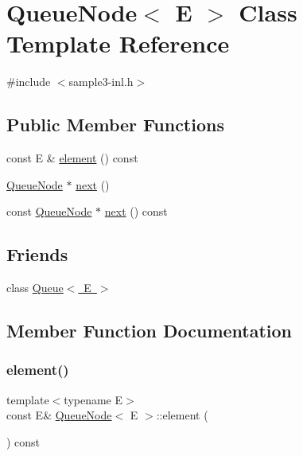 \hypertarget{classQueueNode}{}\section{Queue\+Node$<$ E $>$ Class Template Reference}
\label{classQueueNode}


{\ttfamily \#include $<$sample3-\/inl.\+h$>$}

\subsection*{Public Member Functions}
\begin{DoxyCompactItemize}
\item 
const E \& \mbox{\hyperlink{classQueueNode_a1c61b3ed32e089f5901b87022ef84985}{element}} () const
\item 
\mbox{\hyperlink{classQueueNode}{Queue\+Node}} $\ast$ \mbox{\hyperlink{classQueueNode_a8a9fdf488da06533360999ef85db56ea}{next}} ()
\item 
const \mbox{\hyperlink{classQueueNode}{Queue\+Node}} $\ast$ \mbox{\hyperlink{classQueueNode_ada477e4f309f29383112dbda473dd985}{next}} () const
\end{DoxyCompactItemize}
\subsection*{Friends}
\begin{DoxyCompactItemize}
\item 
class \mbox{\hyperlink{classQueueNode_ad4336229b1d7c3626e4ba69f236b202d}{Queue$<$ E $>$}}
\end{DoxyCompactItemize}


\subsection{Member Function Documentation}
\mbox{\label{classQueueNode_a1c61b3ed32e089f5901b87022ef84985}} 
\subsubsection{\texorpdfstring{element()}{element()}}
{\footnotesize\ttfamily template$<$typename E$>$ \\
const E\& \mbox{\hyperlink{classQueueNode}{Queue\+Node}}$<$ E $>$\+::element (\begin{DoxyParamCaption}{ }\end{DoxyParamCaption}) const\hspace{0.3cm}{\ttfamily [inline]}}

